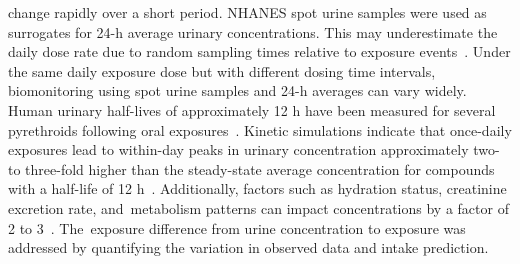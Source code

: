 \documentclass[toxics,article,accept,pdftex,moreauthors]{Definitions/mdpi}
\begin{document}
\begin{itemize}
  change rapidly over a short period. NHANES spot urine
  samples were used as surrogates for 24-h average urinary concentrations. 
  This may underestimate the daily dose rate due to random sampling
  times relative to exposure events~\citep{aylward_interpreting_2012}.
  Under the same daily exposure dose but with different dosing time
  intervals, biomonitoring using spot urine samples and 24-h averages
  can vary widely. Human urinary half-lives of approximately 12
  h have been measured for several pyrethroids following oral
  exposures~\citep{leng1997biological, woollen_metabolism_1992}. Kinetic
  simulations indicate that once-daily exposures lead to within-day
  peaks in urinary concentration approximately two- to three-fold higher
  than the steady-state average concentration for compounds with a
  half-life of 12 h~\citep{aylward_screening_level_2018}.
  Additionally, factors such as hydration status, creatinine excretion
  rate, and~metabolism patterns can impact concentrations by a factor of
  2 to 3~\citep{scher2007agreement}. The~exposure difference from urine
  concentration to exposure was addressed by quantifying the variation
  in observed data and intake prediction.
\end{itemize}
\end{document}
